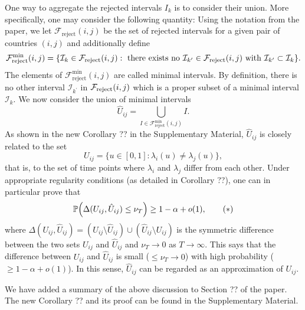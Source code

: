 \documentclass[a4paper,12pt]{article}
\begin{document}
\begin{enumerate}[label=(\arabic*),leftmargin=0.7cm]
One way to aggregate the rejected intervals $I_k$ is to consider their union. More specifically, one may consider the following quantity: Using the notation from the paper, we let $\mathcal{F}_{\text{reject}}(i,j)$ be the set of rejected intervals for a given pair of countries $(i,j)$ and additionally define 
\[ \mathcal{F}_{\text{reject}}^{\text{min}}(i,j) = \{ \mathcal{I}_k \in \mathcal{F}_{\text{reject}}(i,j): \text{ there exists no } \mathcal{I}_{k^\prime} \in \mathcal{F}_{\text{reject}}(i,j) \text{ with } \mathcal{I}_{k^\prime} \subset \mathcal{I}_k \}. \]
The elements of $\mathcal{F}_{\text{reject}}^{\text{min}}(i,j)$ are called minimal intervals. By definition, there is no other interval $\mathcal{I}_{k^\prime}$ in $\mathcal{F}_{\text{reject}}(i,j)$ which is a proper subset of a minimal interval $\mathcal{I}_k$. We now consider the union of minimal intervals
\[ \hat{U}_{ij} = \bigcup_{I \in \mathcal{F}_{\text{reject}}^{\text{min}}(i,j)} I. \]
As shown in the new Corollary ?? in the Supplementary Material, $\hat{U}_{ij}$ is closely related to the set 
\[ U_{ij} = \{ u \in [0,1]: \lambda_i(u) \ne \lambda_j(u) \}, \] 
that is, to the set of time points where $\lambda_i$ and $\lambda_j$ differ from each other. Under appropriate regularity conditions (as detailed in Corollary ??), one can in particular prove that \begin{equation}\label{eq:Uij}
\mathbb{P} \Big( \Delta(U_{ij}, \hat{U}_{ij}) \le \nu_T \Big) \ge 1-\alpha + o(1), \tag{$*$}
\end{equation}
where $\Delta(U_{ij},\hat{U}_{ij}) = (U_{ij} \setminus \hat{U}_{ij}) \cup (\hat{U}_{ij} \setminus U_{ij})$ is the symmetric difference between the two sets $U_{ij}$ and $\hat{U}_{ij}$ and $\nu_T \to 0$ as $T \to \infty$. This says that the difference between $U_{ij}$ and $\hat{U}_{ij}$ is small ($\le \nu_T \to 0$) with high probability ($\ge 1 -\alpha + o(1)$). In this sense, $\hat{U}_{ij}$ can be regarded as an approximation of $U_{ij}$. 

{\color{red}
We have added a summary of the above discussion to Section ?? of the paper. The new Corollary ?? and its proof can be found in the Supplementary Material.
}


\end{enumerate}
\end{document}
